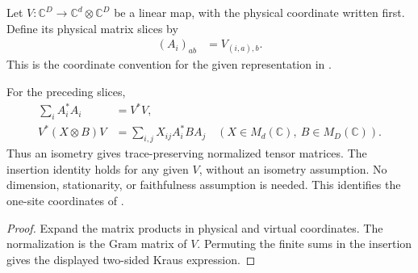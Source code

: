 \begin{definition}
    \label{def:supplied_physical_isometry_tensor}
    \leanok
    Let $V:\mathbb C^D\to\mathbb C^d\otimes\mathbb C^D$ be a linear map,
    with the physical coordinate written first. Define its physical matrix
    slices by
    \begin{align}
        (A_i)_{ab} & =V_{(i,a),b}.
    \end{align}
    This is the coordinate convention for the given representation in
    \cite[equation~(3.6)]{Nachtergaele1996Spectral}.
\end{definition}

\begin{lemma}
    \label{thm:supplied_isometry_heisenberg_insertion}
    \leanok
    For the preceding slices,
    \begin{align}
        \sum_iA_i^*A_i   & =V^*V,
        \\
        V^*(X\otimes B)V & =\sum_{i,j}X_{ij}A_i^*BA_j
        \quad(X\in M_d(\mathbb C),\ B\in M_D(\mathbb C)).
    \end{align}
    Thus an isometry gives trace-preserving normalized tensor matrices.
    The insertion identity holds for any given $V$, without an isometry
    assumption. No dimension, stationarity, or faithfulness assumption is
    needed. This identifies the one-site coordinates of
    \cite[equation~(3.6)]{Nachtergaele1996Spectral}.
\end{lemma}
\begin{proof}\leanok
    Expand the matrix products in physical and virtual coordinates.
    The normalization is the Gram matrix of $V$. Permuting the finite sums
    in the insertion gives the displayed two-sided Kraus expression.
\end{proof}


